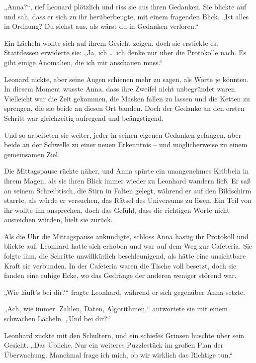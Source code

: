 \documentclass[
]{article}
\begin{document}
„Anna?{\kern0pt}``, rief Leonard plötzlich und riss sie aus ihren
Gedanken. Sie blickte auf und sah, dass er sich zu ihr herüberbeugte,
mit einem fragenden Blick. „Ist alles in Ordnung? Du siehst aus, als
wärst du in Gedanken verloren.``

Ein Lächeln wollte sich auf ihrem Gesicht zeigen, doch sie erstickte es.
Stattdessen erwiderte sie: „Ja, ich \ldots{} ich denke nur über die
Protokolle nach. Es gibt einige Anomalien, die ich mir anschauen muss.``

Leonard nickte, aber seine Augen schienen mehr zu sagen, als Worte je
könnten. In diesem Moment wusste Anna, dass ihre Zweifel nicht
unbegründet waren. Vielleicht war die Zeit gekommen, die Masken fallen
zu lassen und die Ketten zu sprengen, die sie beide an diesen Ort
banden. Doch der Gedanke an den ersten Schritt war gleichzeitig
aufregend und beängstigend.

Und so arbeiteten sie weiter, jeder in seinen eigenen Gedanken gefangen,
aber beide an der Schwelle zu einer neuen Erkenntnis -- und
möglicherweise zu einem gemeinsamen Ziel.

Die Mittagspause rückte näher, und Anna spürte ein unangenehmes Kribbeln
in ihrem Magen, als sie ihren Blick immer wieder zu Leonhard wandern
ließ. Er saß an seinem Schreibtisch, die Stirn in Falten gelegt, während
er auf den Bildschirm starrte, als würde er versuchen, das Rätsel des
Universums zu lösen. Ein Teil von ihr wollte ihn ansprechen, doch das
Gefühl, dass die richtigen Worte nicht ausreichen würden, hielt sie
zurück.

Als die Uhr die Mittagspause ankündigte, schloss Anna hastig ihr
Protokoll und blickte auf. Leonhard hatte sich erhoben und war auf dem
Weg zur Cafeteria. Sie folgte ihm, die Schritte unwillkürlich
beschleunigend, als hätte eine unsichtbare Kraft sie verbunden. In der
Cafeteria waren die Tische voll besetzt, doch sie fanden eine ruhige
Ecke, wo das Gedränge der anderen weniger störend war.

„Wie läuft's bei dir?{\kern0pt}`` fragte Leonhard, während er sich
gegenüber Anna setzte.

„Ach, wie immer. Zahlen, Daten, Algorithmen,`` antwortete sie mit einem
schwachen Lächeln. „Und bei dir?{\kern0pt}``

Leonhard zuckte mit den Schultern, und ein schiefes Grinsen huschte über
sein Gesicht. „Das Übliche. Nur ein weiteres Puzzlestück im großen Plan
der Überwachung. Manchmal frage ich mich, ob wir wirklich das Richtige
tun.``
\end{document}
